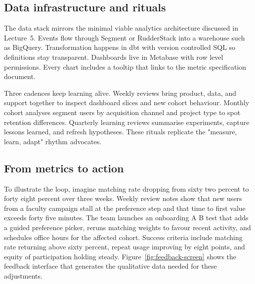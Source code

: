 \subsection*{Data infrastructure and rituals}
The data stack mirrors the minimal viable analytics architecture discussed in Lecture~5. Events flow through Segment or RudderStack into a warehouse such as BigQuery. Transformation happens in dbt with version controlled SQL so definitions stay transparent. Dashboards live in Metabase with row level permissions. Every chart includes a tooltip that links to the metric specification document.

Three cadences keep learning alive. Weekly reviews bring product, data, and support together to inspect dashboard slices and new cohort behaviour. Monthly cohort analyses segment users by acquisition channel and project type to spot retention differences. Quarterly learning reviews summarise experiments, capture lessons learned, and refresh hypotheses. These rituals replicate the "measure, learn, adapt" rhythm \citet{Choudary2016} advocates.

\subsection*{From metrics to action}
To illustrate the loop, imagine matching rate dropping from sixty two percent to forty eight percent over three weeks. Weekly review notes show that new users from a faculty campaign stall at the preference step and that time to first value exceeds forty five minutes. The team launches an onboarding A B test that adds a guided preference picker, reruns matching weights to favour recent activity, and schedules office hours for the affected cohort. Success criteria include matching rate returning above sixty percent, repeat usage improving by eight points, and equity of participation holding steady. Figure~\ref{fig:feedback-screen} shows the feedback interface that generates the qualitative data needed for these adjustments.

